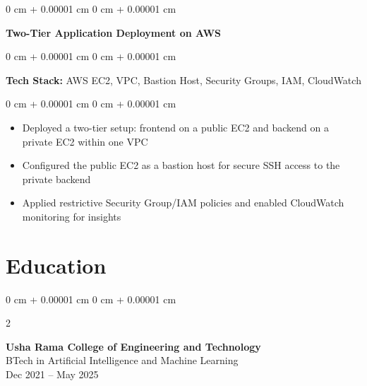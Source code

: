 \documentclass[10pt, letterpaper]{article}
\newenvironment{highlights}{
    \begin{itemize}[
        topsep=0.10 cm,
        parsep=0.10 cm,
        partopsep=0pt,
        itemsep=0pt,
        leftmargin=0 cm + 10pt
    ]
}{
    \end{itemize}
} %
\newenvironment{onecolentry}{
    \begin{adjustwidth}{
        0 cm + 0.00001 cm
    }{
        0 cm + 0.00001 cm
    }
}{
    \end{adjustwidth}
} %
\newenvironment{twocolentry}[2][]{
    \onecolentry
    \def\secondColumn{#2}
    \setcolumnwidth{\fill, 4.5 cm}
    \begin{paracol}{2}
}{
    \switchcolumn \raggedleft \secondColumn
    \end{paracol}
    \endonecolentry
} %
\begin{document}
    \begin{onecolentry}
        \textbf{Two-Tier Application Deployment on AWS}  
    \end{onecolentry}

    \vspace{0.10 cm}

    \begin{onecolentry}
        \textbf{Tech Stack:} AWS EC2, VPC, Bastion Host, Security Groups, IAM, CloudWatch  
    \end{onecolentry}

    \vspace{0.10 cm}

    \begin{onecolentry}
        \begin{highlights}
            \item Deployed a two-tier setup: frontend on a public EC2 and backend on a private EC2 within one VPC
            \item Configured the public EC2 as a bastion host for secure SSH access to the private backend
            \item Applied restrictive Security Group/IAM policies and enabled CloudWatch monitoring for insights
        \end{highlights}
    \end{onecolentry}

    \section{Education}
    \begin{twocolentry}{Dec 2021 – May 2025}
        \textbf{Usha Rama College of Engineering and Technology} \\
        BTech in Artificial Intelligence and Machine Learning \\
    \end{twocolentry}
\end{document}
